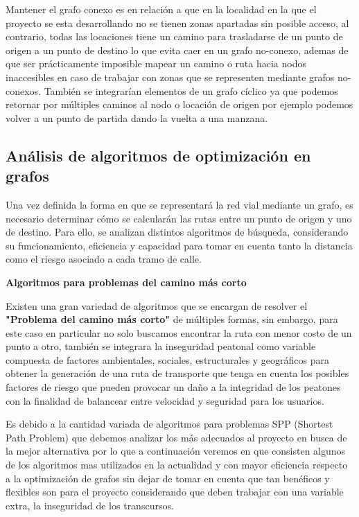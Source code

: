 Mantener el grafo conexo es en relación a que en la localidad en la que el proyecto se esta desarrollando no se tienen zonas apartadas sin posible acceso, al contrario, todas las locaciones tiene un camino para trasladarse de un punto de origen a un punto de destino lo que evita caer en un grafo no-conexo, ademas de que ser prácticamente imposible mapear un camino o ruta hacia nodos inaccesibles en caso de trabajar con zonas que se representen mediante grafos no-conexos. También se integrarían elementos de un grafo cíclico ya que podemos retornar por múltiples caminos al nodo o locación de origen por ejemplo podemos volver a un punto de partida dando la vuelta a una manzana. 


\newpage

\subsection{Análisis de algoritmos de optimización en grafos}

Una vez definida la forma en que se representará la red vial mediante un grafo, es necesario determinar cómo se calcularán las rutas entre un punto de origen y uno de destino. Para ello, se analizan distintos algoritmos de búsqueda, considerando su funcionamiento, eficiencia y capacidad para tomar en cuenta tanto la distancia como el riesgo asociado a cada tramo de calle.

\textbf{Algoritmos para problemas del camino más corto} \\
\label{AgSPP}

Existen una gran variedad de algoritmos que se encargan de resolver el \textbf{"Problema del camino más corto"} de múltiples formas, sin embargo, para este caso en particular no solo buscamos encontrar la ruta con menor costo de un punto a otro, también se integrara la inseguridad peatonal como variable compuesta de factores ambientales, sociales, estructurales y geográficos para obtener la generación de una ruta de transporte que tenga en cuenta los posibles factores de riesgo que pueden provocar un daño a la integridad de los peatones con la finalidad de balancear entre velocidad y seguridad para los usuarios. 

Es debido a la cantidad variada de algoritmos para problemas SPP (Shortest Path Problem) que debemos analizar los más adecuados al proyecto en busca de la mejor alternativa por lo que a continuación veremos en que consisten algunos de los algoritmos mas utilizados en la actualidad y con mayor eficiencia respecto a la optimización de grafos sin dejar de tomar en cuenta que tan benéficos y flexibles son para el proyecto considerando que deben trabajar con una variable extra, la inseguridad de los transcursos.

